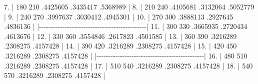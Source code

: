 \documentclass[
  12pt,
  letterpaper,
  DIV=11,
  numbers=noendperiod,
  onepage,
  openany]{scrreprt}
\newenvironment{Shaded}{\begin{snugshade}}{\end{snugshade}}
\newcommand{\DecValTok}[1]{\textcolor[rgb]{0.86,0.86,0.80}{#1}}
\newcommand{\ErrorTok}[1]{\textcolor[rgb]{0.76,0.75,0.62}{#1}}
\newcommand{\FloatTok}[1]{\textcolor[rgb]{0.75,0.75,0.82}{#1}}
\newcommand{\NormalTok}[1]{\textcolor[rgb]{0.80,0.80,0.80}{#1}}
\newcommand{\SpecialCharTok}[1]{\textcolor[rgb]{0.86,0.64,0.64}{#1}}
\begin{document}
\begin{Shaded}
\begin{Highlighting}[]
  \FloatTok{7.} \SpecialCharTok{|}  \DecValTok{180}    \DecValTok{210}\NormalTok{   .}\DecValTok{4425605}\NormalTok{   .}\DecValTok{3435417}\NormalTok{   .}\DecValTok{5368989} \SpecialCharTok{|}
  \FloatTok{8.} \SpecialCharTok{|}  \DecValTok{210}    \DecValTok{240}\NormalTok{   .}\DecValTok{4105681}\NormalTok{   .}\DecValTok{3132064}\NormalTok{   .}\DecValTok{5052779} \SpecialCharTok{|}
  \FloatTok{9.} \SpecialCharTok{|}  \DecValTok{240}    \DecValTok{270}\NormalTok{   .}\DecValTok{3997637}\NormalTok{   .}\DecValTok{3030412}\NormalTok{   .}\DecValTok{4945301} \SpecialCharTok{|}
 \FloatTok{10.} \SpecialCharTok{|}  \DecValTok{270}    \DecValTok{300}\NormalTok{   .}\DecValTok{3888113}\NormalTok{   .}\DecValTok{2927645}\NormalTok{   .}\DecValTok{4836136} \SpecialCharTok{|}
     \ErrorTok{|}\SpecialCharTok{{-}{-}{-}{-}{-}{-}{-}{-}{-}{-}{-}{-}{-}{-}{-}{-}{-}{-}{-}{-}{-}{-}{-}{-}{-}{-}{-}{-}{-}{-}{-}{-}{-}{-}{-}{-}{-}{-}{-}{-}{-}{-}{-}{-}{-}{-}}\ErrorTok{|}
 \FloatTok{11.} \SpecialCharTok{|}  \DecValTok{300}    \DecValTok{330}\NormalTok{   .}\DecValTok{3665935}\NormalTok{   .}\DecValTok{2720434}\NormalTok{   .}\DecValTok{4613676} \SpecialCharTok{|}
 \FloatTok{12.} \SpecialCharTok{|}  \DecValTok{330}    \DecValTok{360}\NormalTok{   .}\DecValTok{3554846}\NormalTok{   .}\DecValTok{2617823}\NormalTok{   .}\DecValTok{4501585} \SpecialCharTok{|}
 \FloatTok{13.} \SpecialCharTok{|}  \DecValTok{360}    \DecValTok{390}\NormalTok{   .}\DecValTok{3216289}\NormalTok{   .}\DecValTok{2308275}\NormalTok{   .}\DecValTok{4157428} \SpecialCharTok{|}
 \FloatTok{14.} \SpecialCharTok{|}  \DecValTok{390}    \DecValTok{420}\NormalTok{   .}\DecValTok{3216289}\NormalTok{   .}\DecValTok{2308275}\NormalTok{   .}\DecValTok{4157428} \SpecialCharTok{|}
 \FloatTok{15.} \SpecialCharTok{|}  \DecValTok{420}    \DecValTok{450}\NormalTok{   .}\DecValTok{3216289}\NormalTok{   .}\DecValTok{2308275}\NormalTok{   .}\DecValTok{4157428} \SpecialCharTok{|}
     \ErrorTok{|}\SpecialCharTok{{-}{-}{-}{-}{-}{-}{-}{-}{-}{-}{-}{-}{-}{-}{-}{-}{-}{-}{-}{-}{-}{-}{-}{-}{-}{-}{-}{-}{-}{-}{-}{-}{-}{-}{-}{-}{-}{-}{-}{-}{-}{-}{-}{-}{-}{-}}\ErrorTok{|}
 \FloatTok{16.} \SpecialCharTok{|}  \DecValTok{480}    \DecValTok{510}\NormalTok{   .}\DecValTok{3216289}\NormalTok{   .}\DecValTok{2308275}\NormalTok{   .}\DecValTok{4157428} \SpecialCharTok{|}
 \FloatTok{17.} \SpecialCharTok{|}  \DecValTok{510}    \DecValTok{540}\NormalTok{   .}\DecValTok{3216289}\NormalTok{   .}\DecValTok{2308275}\NormalTok{   .}\DecValTok{4157428} \SpecialCharTok{|}
 \FloatTok{18.} \SpecialCharTok{|}  \DecValTok{540}    \DecValTok{570}\NormalTok{   .}\DecValTok{3216289}\NormalTok{   .}\DecValTok{2308275}\NormalTok{   .}\DecValTok{4157428} \SpecialCharTok{|}

\end{Highlighting}
\end{Shaded}
\end{document}
